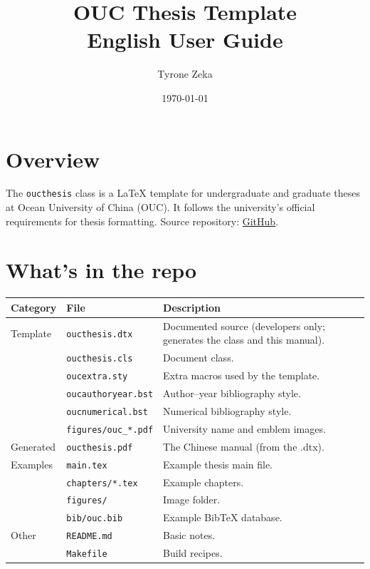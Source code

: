 \documentclass[12pt]{article}
\title{OUC Thesis Template\\English User Guide}
\author{Tyrone Zeka\\}
\date{\today}
\begin{document}
\maketitle

\section{Overview}
The \texttt{oucthesis} class is a \LaTeX{} template for undergraduate and graduate theses at Ocean University of China (OUC). It follows the university’s official requirements for thesis formatting. Source repository: \href{https://github.com/kevytendy/OUC--Thesis-Template-Latex}{GitHub}.

\section{What’s in the repo}
\begin{longtable}{@{}llp{}@{}}
\toprule
Category & File & Description\\
\midrule
Template & \texttt{oucthesis.dtx} & Documented source (developers only; generates the class and this manual).\\
         & \texttt{oucthesis.cls} & Document class.\\
         & \texttt{oucextra.sty}  & Extra macros used by the template.\\
         & \texttt{oucauthoryear.bst} & Author–year bibliography style.\\
         & \texttt{oucnumerical.bst}  & Numerical bibliography style.\\
         & \texttt{figures/ouc\_*.pdf} & University name and emblem images.\\
\addlinespace
Generated & \texttt{oucthesis.pdf} & The Chinese manual (from the .dtx).\\
\addlinespace
Examples & \texttt{main.tex} & Example thesis main file.\\
         & \texttt{chapters/*.tex} & Example chapters.\\
         & \texttt{figures/} & Image folder.\\
         & \texttt{bib/ouc.bib} & Example Bib\TeX{} database.\\
\addlinespace
Other & \texttt{README.md} & Basic notes.\\
      & \texttt{Makefile} & Build recipes.\\
\bottomrule
\end{longtable}
\end{document}
